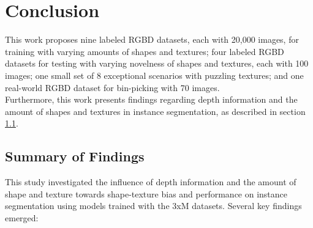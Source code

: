 \chapter{Conclusion}
\label{chap:kapitel6}
	This work proposes nine labeled RGBD datasets, each with 20,000 images, for training with varying amounts of shapes and textures; four labeled RGBD datasets for testing with varying novelness of shapes and textures, each with 100 images; one small set of 8 exceptional scenarios with puzzling textures; and one real-world RGBD dataset for bin-picking with 70 images.\\
	Furthermore, this work presents findings regarding depth information and the amount of shapes and textures in instance segmentation, as described in section \ref{sec:summary-of-findings}.


	\section{Summary of Findings}
	\label{sec:summary-of-findings}
		This study investigated the influence of depth information and the amount of shape and texture towards shape-texture bias and performance on instance segmentation using models trained with the 3xM datasets. Several key findings emerged:

